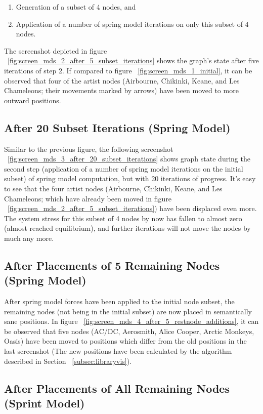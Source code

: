 \begin{enumerate}
	\item Generation of a subset of 4 nodes, and
	\item Application of a number of spring model iterations on only this subset of 4 nodes.
\end{enumerate}

The screenshot depicted in figure ~\ref{fig:screen_mds_2_after_5_subset_iterations} shows the graph's state after five iterations of step 2. If compared to figure ~\ref{fig:screen_mds_1_initial}, it can be observed that four of the artist nodes (Airbourne, Chikinki, Keane, and Les Chameleons; their movements marked by arrows) have been moved to more outward positions.

\subsection{After 20 Subset Iterations (Spring Model)}

Similar to the previous figure, the following screenshot ~\ref{fig:screen_mds_3_after_20_subset_iterations} shows graph state during the second step (application of a number of spring model iterations on the initial subset) of spring model computation, but with 20 iterations of progress. It's easy to see that the four artist nodes (Airbourne, Chikinki, Keane, and Les Chameleons; which have already been moved in figure ~\ref{fig:screen_mds_2_after_5_subset_iterations}) have been displaced even more. The system stress for this subset of 4 nodes by now has fallen to almost zero (almost reached equilibrium), and further iterations will not move the nodes by much any more.

\subsection{After Placements of 5 Remaining Nodes (Spring Model)}

After spring model forces have been applied to the initial node subset, the remaining nodes (not being in the initial subset) are now placed in semantically sane positions. In figure ~\ref{fig:screen_mds_4_after_5_restnode_additions}, it can be observed that five nodes (AC/DC, Aerosmith, Alice Cooper, Arctic Monkeys, Oasis) have been moved to positions which differ from the old positions in the last screenshot (The new positions have been calculated by the algorithm described in Section ~\ref{subsec:libraryvis}). 

\subsection{After Placements of All Remaining Nodes (Sprint Model)}

